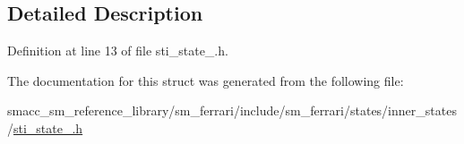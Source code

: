 \subsection{Detailed Description}


Definition at line 13 of file sti\+\_\+state\+\_.\+h.



The documentation for this struct was generated from the following file\+:\begin{DoxyCompactItemize}
\item 
smacc\+\_\+sm\+\_\+reference\+\_\+library/sm\+\_\+ferrari/include/sm\+\_\+ferrari/states/inner\+\_\+states/\hyperlink{sm__ferrari_2include_2sm__ferrari_2states_2inner__states_2sti__state__2_8h}{sti\+\_\+state\+\_.\+h}\end{DoxyCompactItemize}
